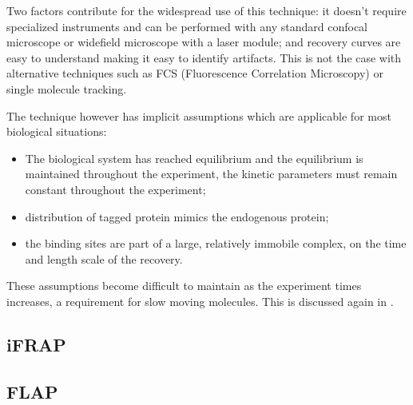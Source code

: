     Two factors contribute for the widespread use of this technique:
    it doesn't require specialized instruments and can be performed with
    any standard confocal microscope or widefield microscope with a laser
    module; and recovery curves are easy to understand making it easy to
    identify artifacts.  This is not the case with alternative techniques
    such as FCS (Fluorescence Correlation Microscopy) or single molecule
    tracking.

    The technique however has implicit assumptions which are applicable
    for most biological situations:

    \begin{itemize}
      \item The biological system has reached equilibrium and the equilibrium
        is maintained throughout the experiment, \ie{} the kinetic parameters
        must remain constant throughout the experiment;

      \item distribution of tagged protein mimics the endogenous protein;

      \item the binding sites are part of a large, relatively immobile
        complex, on the time and length scale of the recovery.
    \end{itemize}

    These assumptions become difficult to maintain as the experiment
    times increases, a requirement for slow moving molecules.  This
    is discussed again in .

  \subsection{iFRAP}


  \subsection{FLAP}

